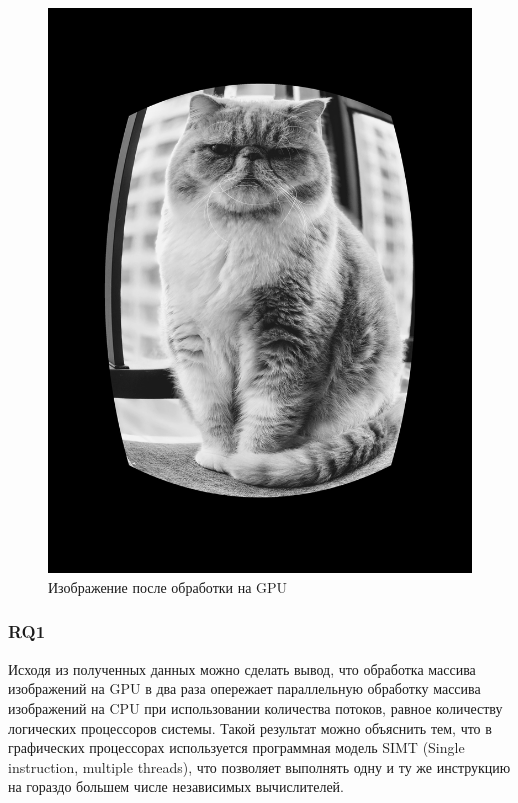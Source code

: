 \begin{figure}[H]
    \centering
    \includegraphics[width=\textwidth]{figures/GPUCat.jpg}
    \caption{Изображение после обработки на GPU}
    \label{fig:gpucat}
\end{figure}

\subsubsection{RQ1}
Исходя из полученных данных можно сделать вывод, что обработка массива изображений на GPU в два раза опережает параллельную обработку массива изображений на CPU при использовании количества потоков, равное количеству логических процессоров системы. Такой результат можно объяснить тем, что в графических процессорах используется программная модель SIMT (Single instruction, multiple threads), что позволяет выполнять одну и ту же инструкцию на гораздо большем числе независимых вычислителей.
